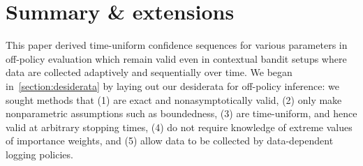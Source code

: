 




  

\section{Summary \& extensions}\label{section:summary}

This paper derived time-uniform confidence sequences for various parameters in off-policy evaluation which remain valid even in contextual bandit setups where data are collected adaptively and sequentially over time. We began in~\cref{section:desiderata} by laying out our desiderata for off-policy inference: we sought methods that (1) are exact and nonasymptotically valid, (2) only make nonparametric assumptions such as boundedness, (3) are time-uniform, and hence valid at arbitrary stopping times, (4) do not require knowledge of extreme values of importance weights, and (5) allow data to be collected by data-dependent logging policies.

